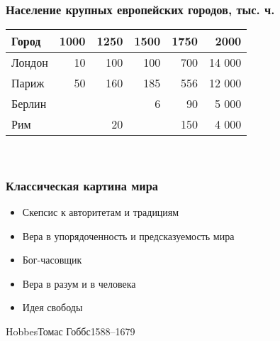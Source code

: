\documentclass[aspectratio=169]{beamer}
\begin{document}

\begin{bframe}\frametitle{Население крупных европейских городов, тыс. ч.}
\begin{center}
\begin{tabular}{l| r r r r r}
\hline \hline
Город      & 1000         & 1250        & 1500          & 1750             & 2000           \\
\hline \hline
Лондон     & 10           & 100          & 100           & 700              & 14 000         \\
Париж      & 50           & 160          & 185           & 556              & 12 000         \\
Берлин     &              &              & 6             & 90               & 5 000          \\
Рим        &              & 20           &               & 150              & 4 000          \\
\hline \hline 
\end{tabular}\\[10pt]

\end{center}
\end{bframe}






\begin{bframe}\frametitle{Классическая картина мира}
\begin{itemize}
\item<+-> Скепсис к авторитетам и традициям
\item<+-> Вера в упорядоченность и предсказуемость мира
\item<+-> Бог-часовщик
\item<+-> Вера в разум и в человека
\item<+-> Идея свободы
\end{itemize} 
\end{bframe}


\begin{Person}{Hobbes}{Томас Гоббс}{1588--1679}

\end{Person}
\end{document}
